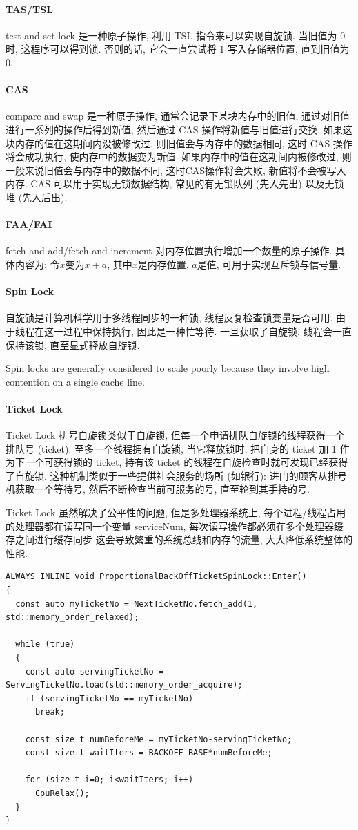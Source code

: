 \documentclass[UTF8,12pt,a4paper]{article}
\begin{document}
\paragraph{TAS/TSL}
test-and-set-lock 是一种原子操作, 利用 TSL 指令来可以实现自旋锁.
当旧值为 0 时, 这程序可以得到锁.
否则的话, 它会一直尝试将 1 写入存储器位置, 直到旧值为 0.
\paragraph{CAS}
compare-and-swap 是一种原子操作,
通常会记录下某块内存中的旧值, 通过对旧值进行一系列的操作后得到新值,
然后通过 CAS 操作将新值与旧值进行交换.
如果这块内存的值在这期间内没被修改过, 则旧值会与内存中的数据相同,
这时 CAS 操作将会成功执行, 使内存中的数据变为新值.
如果内存中的值在这期间内被修改过, 则一般来说旧值会与内存中的数据不同,
这时CAS操作将会失败, 新值将不会被写入内存.
CAS 可以用于实现无锁数据结构, 常见的有无锁队列 (先入先出) 以及无锁堆 (先入后出).
\paragraph{FAA/FAI}
fetch-and-add/fetch-and-increment 对内存位置执行增加一个数量的原子操作.
具体内容为: 令$x$变为$x+a$, 其中$x$是内存位置, $a$是值, 可用于实现互斥锁与信号量.
\paragraph{Spin Lock}
自旋锁是计算机科学用于多线程同步的一种锁, 线程反复检查锁变量是否可用.
由于线程在这一过程中保持执行, 因此是一种忙等待.
一旦获取了自旋锁, 线程会一直保持该锁, 直至显式释放自旋锁.

Spin locks are generally considered to scale poorly
because they involve high contention on a single cache line.
\paragraph{Ticket Lock}
Ticket Lock 排号自旋锁类似于自旋锁, 但每一个申请排队自旋锁的线程获得一个排队号 (ticket).
至多一个线程拥有自旋锁, 当它释放锁时, 把自身的 ticket 加 1 作为下一个可获得锁的 ticket,
持有该 ticket 的线程在自旋检查时就可发现已经获得了自旋锁.
这种机制类似于一些提供社会服务的场所 (如银行):
进门的顾客从排号机获取一个等待号, 然后不断检查当前可服务的号, 直至轮到其手持的号.

Ticket Lock 虽然解决了公平性的问题, 但是多处理器系统上,
每个进程/线程占用的处理器都在读写同一个变量 serviceNum,
每次读写操作都必须在多个处理器缓存之间进行缓存同步
这会导致繁重的系统总线和内存的流量, 大大降低系统整体的性能.
\begin{lstlisting}
ALWAYS_INLINE void ProportionalBackOffTicketSpinLock::Enter()
{
  const auto myTicketNo = NextTicketNo.fetch_add(1, std::memory_order_relaxed);
 
  while (true)
  {
    const auto servingTicketNo = ServingTicketNo.load(std::memory_order_acquire);
    if (servingTicketNo == myTicketNo)
      break;
 
    const size_t numBeforeMe = myTicketNo-servingTicketNo;
    const size_t waitIters = BACKOFF_BASE*numBeforeMe;
 
    for (size_t i=0; i<waitIters; i++)
      CpuRelax();
  }
}
\end{lstlisting}
\end{document}
